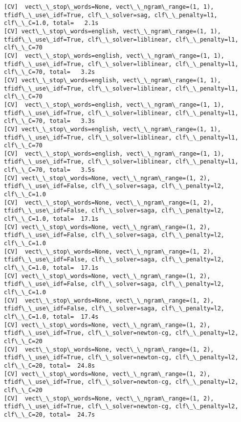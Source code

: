\documentclass[11pt]{article}
\begin{document}
    \begin{Verbatim}[commandchars=\\\{\}]
[CV]  vect\_\_stop\_words=None, vect\_\_ngram\_range=(1, 1), tfidf\_\_use\_idf=True, clf\_\_solver=sag, clf\_\_penalty=l1, clf\_\_C=1.0, total=   2.1s
[CV] vect\_\_stop\_words=english, vect\_\_ngram\_range=(1, 1), tfidf\_\_use\_idf=True, clf\_\_solver=liblinear, clf\_\_penalty=l1, clf\_\_C=70 
[CV]  vect\_\_stop\_words=english, vect\_\_ngram\_range=(1, 1), tfidf\_\_use\_idf=True, clf\_\_solver=liblinear, clf\_\_penalty=l1, clf\_\_C=70, total=   3.2s
[CV] vect\_\_stop\_words=english, vect\_\_ngram\_range=(1, 1), tfidf\_\_use\_idf=True, clf\_\_solver=liblinear, clf\_\_penalty=l1, clf\_\_C=70 
[CV]  vect\_\_stop\_words=english, vect\_\_ngram\_range=(1, 1), tfidf\_\_use\_idf=True, clf\_\_solver=liblinear, clf\_\_penalty=l1, clf\_\_C=70, total=   3.3s
[CV] vect\_\_stop\_words=english, vect\_\_ngram\_range=(1, 1), tfidf\_\_use\_idf=True, clf\_\_solver=liblinear, clf\_\_penalty=l1, clf\_\_C=70 
[CV]  vect\_\_stop\_words=english, vect\_\_ngram\_range=(1, 1), tfidf\_\_use\_idf=True, clf\_\_solver=liblinear, clf\_\_penalty=l1, clf\_\_C=70, total=   3.5s
[CV] vect\_\_stop\_words=None, vect\_\_ngram\_range=(1, 2), tfidf\_\_use\_idf=False, clf\_\_solver=saga, clf\_\_penalty=l2, clf\_\_C=1.0 
[CV]  vect\_\_stop\_words=None, vect\_\_ngram\_range=(1, 2), tfidf\_\_use\_idf=False, clf\_\_solver=saga, clf\_\_penalty=l2, clf\_\_C=1.0, total=  17.1s
[CV] vect\_\_stop\_words=None, vect\_\_ngram\_range=(1, 2), tfidf\_\_use\_idf=False, clf\_\_solver=saga, clf\_\_penalty=l2, clf\_\_C=1.0 
[CV]  vect\_\_stop\_words=None, vect\_\_ngram\_range=(1, 2), tfidf\_\_use\_idf=False, clf\_\_solver=saga, clf\_\_penalty=l2, clf\_\_C=1.0, total=  17.1s
[CV] vect\_\_stop\_words=None, vect\_\_ngram\_range=(1, 2), tfidf\_\_use\_idf=False, clf\_\_solver=saga, clf\_\_penalty=l2, clf\_\_C=1.0 
[CV]  vect\_\_stop\_words=None, vect\_\_ngram\_range=(1, 2), tfidf\_\_use\_idf=False, clf\_\_solver=saga, clf\_\_penalty=l2, clf\_\_C=1.0, total=  17.4s
[CV] vect\_\_stop\_words=None, vect\_\_ngram\_range=(1, 2), tfidf\_\_use\_idf=True, clf\_\_solver=newton-cg, clf\_\_penalty=l2, clf\_\_C=20 
[CV]  vect\_\_stop\_words=None, vect\_\_ngram\_range=(1, 2), tfidf\_\_use\_idf=True, clf\_\_solver=newton-cg, clf\_\_penalty=l2, clf\_\_C=20, total=  24.8s
[CV] vect\_\_stop\_words=None, vect\_\_ngram\_range=(1, 2), tfidf\_\_use\_idf=True, clf\_\_solver=newton-cg, clf\_\_penalty=l2, clf\_\_C=20 
[CV]  vect\_\_stop\_words=None, vect\_\_ngram\_range=(1, 2), tfidf\_\_use\_idf=True, clf\_\_solver=newton-cg, clf\_\_penalty=l2, clf\_\_C=20, total=  24.7s

\end{Verbatim}
\end{document}
